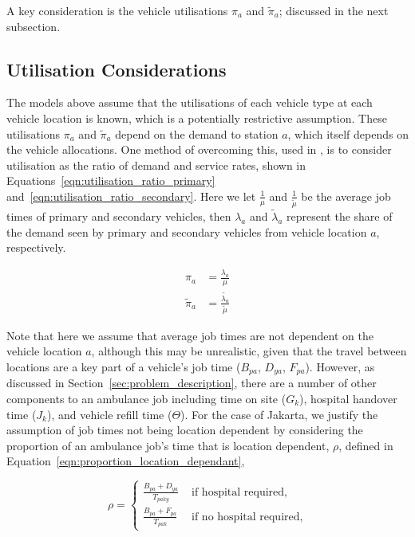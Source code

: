 \documentclass[numbers,webpdf,imaman]{ima-authoring-template}%
\begin{document}
A key consideration is the vehicle utilisations $\pi_a$ and $\tilde{\pi}_a$;
discussed in the next subsection.

\subsection{Utilisation Considerations}\label{sec:utilisation}
The models above assume that the utilisations of each vehicle type at each
vehicle location is known, which is a potentially restrictive assumption.
These utilisations $\pi_a$ and $\tilde{\pi}_a$ depend on the demand to station
$a$, which itself depends on the vehicle allocations. One method of overcoming
this, used in \citet{Knight2012918}, is to consider utilisation as the ratio of
demand and service rates, shown in Equations~\ref{eqn:utilisation_ratio_primary}
and~\ref{eqn:utilisation_ratio_secondary}. Here we let $\frac{1}{\mu}$ and
$\frac{1}{\tilde{\mu}}$ be the average job times of primary and secondary
vehicles, then $\lambda_a$ and $\tilde{\lambda}_a$ represent the share of the
demand seen by primary and secondary vehicles from vehicle location $a$,
respectively.

\begin{align}
\pi_a &= \frac{\lambda_a}{\mu} \label{eqn:utilisation_ratio_primary}\\
\tilde{\pi}_a &= \frac{\tilde{\lambda_a}}{\tilde{\mu}} \label{eqn:utilisation_ratio_secondary}
\end{align}

Note that here we assume that average job times are not dependent on the vehicle
location $a$, although this may be unrealistic, given that the travel between
locations are a key part of a vehicle's job time ($B_{pa}$, $D_{ya}$, $F_{pa}$).
However, as discussed in Section~\ref{sec:problem_description}, there are a
number of other components to an ambulance job including time on site ($G_k$),
hospital handover time ($J_k$), and vehicle refill time ($\Theta$). For the
case of Jakarta, we justify the assumption of job times not being location
dependent by considering the proportion of an ambulance job's time that is
location dependent, $\rho$, defined in
Equation~\ref{eqn:proportion_location_dependant},

\begin{equation}\label{eqn:proportion_location_dependant}
\rho = \begin{cases}
  \frac{B_{pa} + D_{ya}}{T_{paky}} & \text{ if hospital required,} \\[8pt]
  \frac{B_{pa} + F_{pa}}{T_{pak}} & \text{ if no hospital required,}
\end{cases}
\end{equation}
\end{document}
